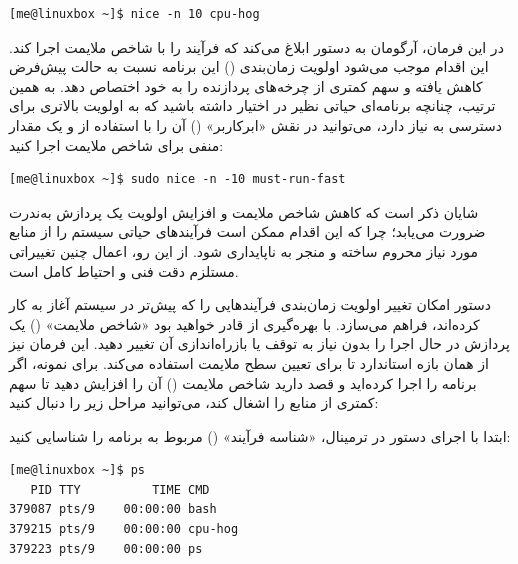 \begin{latin}
\begin{lstlisting}
[me@linuxbox ~]$ nice -n 10 cpu-hog
\end{lstlisting}
\end{latin}

در این فرمان، آرگومان  به دستور  ابلاغ می‌کند که فرآیند  را با شاخص ملایمت  اجرا کند. این اقدام موجب می‌شود اولویت زمان‌بندی () این برنامه نسبت به حالت پیش‌فرض کاهش یافته و سهم کمتری از چرخه‌های پردازنده را به خود اختصاص دهد. به همین ترتیب، چنانچه برنامه‌ای حیاتی نظیر  در اختیار داشته باشید که به اولویت بالاتری برای دسترسی به  نیاز دارد، می‌توانید در نقش «ابرکاربر» () آن را با استفاده از  و یک مقدار منفی برای شاخص ملایمت اجرا کنید:

\begin{latin}
\begin{lstlisting}
[me@linuxbox ~]$ sudo nice -n -10 must-run-fast
\end{lstlisting}
\end{latin}

شایان ذکر است که کاهش شاخص ملایمت و افزایش اولویت یک پردازش به‌ندرت ضرورت می‌یابد؛ چرا که این اقدام ممکن است فرآیندهای حیاتی سیستم را از منابع مورد نیاز محروم ساخته و منجر به ناپایداری شود. از این رو، اعمال چنین تغییراتی مستلزم دقت فنی و احتیاط کامل است.

دستور  امکان تغییر اولویت زمان‌بندی فرآیندهایی را که پیش‌تر در سیستم آغاز به کار کرده‌اند، فراهم می‌سازد. با بهره‌گیری از  قادر خواهید بود «شاخص ملایمت» () یک پردازش در حال اجرا را بدون نیاز به توقف یا بازراه‌اندازی آن تغییر دهید. این فرمان نیز از همان بازه استاندارد  تا  برای تعیین سطح ملایمت استفاده می‌کند. برای نمونه، اگر برنامه  را اجرا کرده‌اید و قصد دارید شاخص ملایمت () آن را افزایش دهید تا سهم کمتری از منابع را اشغال کند، می‌توانید مراحل زیر را دنبال کنید:

ابتدا با اجرای دستور  در ترمینال، «شناسه فرآیند» () مربوط به برنامه  را شناسایی کنید:

\begin{latin}
\begin{lstlisting}
[me@linuxbox ~]$ ps
   PID TTY          TIME CMD
379087 pts/9    00:00:00 bash
379215 pts/9    00:00:00 cpu-hog
379223 pts/9    00:00:00 ps
\end{lstlisting}
\end{latin}

